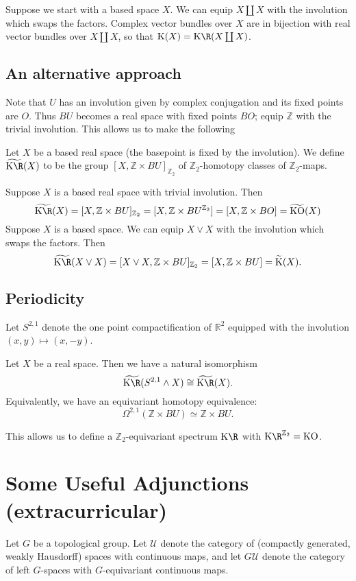 \documentclass[11pt]{article}
\newcommand{\Extracurricular}[1]{
\section*{#1 {\small(extracurricular)}}
}
\begin{document}
Suppose we start with a based space $X$. We can equip $X\coprod X$  with the involution which swaps the factors. Complex vector bundles over $X$ are in bijection with real vector bundles over $X\coprod X$, so that $\K(X)=\KR(X\coprod X)$.
\subsection*{An alternative approach}
Note that $U$ has an involution given by complex conjugation and its fixed points are $O$. Thus $BU$ becomes a real space with fixed points $BO$;  equip $\mathbb{Z}$ with the trivial involution. This allows us to make the following
\begin{defn*} Let $X$ be a based real space (the basepoint is fixed by the involution). We define $\widetilde{\KR}(X)$ to be the group $[X,\mathbb{Z}\times BU]_{\mathbb{Z}_2}$  of $\mathbb{Z}_2$-homotopy classes of $\mathbb{Z}_2$-maps.
\end{defn*}
Suppose $X$ is a based real space with trivial involution. Then \[\widetilde{\KR}(X)=[X,\mathbb{Z}\times BU]_{\mathbb{Z}_2}=[X,\mathbb{Z}\times BU^{\mathbb{Z}_2}]=[X,\mathbb{Z}\times BO]=\widetilde{\KO}(X)\]
Suppose $X$ is a based space. We can equip $X\vee X$ with the involution which swaps the factors. Then \[\widetilde{\KR}(X\vee X)=[X\vee X,\mathbb{Z}\times BU]_{\mathbb{Z}_2}=[X,\mathbb{Z}\times BU]=\widetilde{\K}(X).\]
\subsection*{Periodicity}
Let $S^{2,1}$  denote the one point compactification of $\mathbb{R}^2$ equipped with the involution $(x,y)\mapsto (x,-y)$.

\begin{thm*}
Let $X$ be a real space. Then we have a natural isomorphism
\[\widetilde{\KR}(S^{2,1}\wedge X)\cong\widetilde{\KR}(X).\] Equivalently, we have an equivariant homotopy equivalence:
\[\Omega^{2,1}(\mathbb{Z}\times BU)\simeq\mathbb{Z}\times BU.\]
\end{thm*}
\noindent This allows us to define a $\mathbb{Z}_2$-equivariant spectrum $\KR$ with $\KR^{\mathbb{Z}_2}=\KO$.

\Extracurricular{Some Useful Adjunctions}
Let $G$ be a topological group.
Let $\mathscr{U}$ denote the category of (compactly generated, weakly Hausdorff) spaces with continuous maps, and let $G\mathscr{U}$ denote the category of left $G$-spaces with $G$-equivariant continuous maps.
\end{document}
